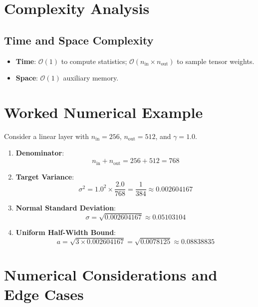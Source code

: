 \documentclass[11pt,a4paper]{article}
\theoremstyle{definition}
\begin{document}
\section{Complexity Analysis}

\subsection{Time and Space Complexity}
\begin{itemize}
    \item \textbf{Time}: $\mathcal{O}(1)$ to compute statistics; $\mathcal{O}(n_{\text{in}} \times n_{\text{out}})$ to sample tensor weights.
    \item \textbf{Space}: $\mathcal{O}(1)$ auxiliary memory.
\end{itemize}

\section{Worked Numerical Example}

Consider a linear layer with $n_{\text{in}} = 256$, $n_{\text{out}} = 512$, and $\gamma = 1.0$.

\begin{enumerate}
    \item \textbf{Denominator}:
    \begin{equation}
    n_{\text{in}} + n_{\text{out}} = 256 + 512 = 768
    \end{equation}
    \item \textbf{Target Variance}:
    \begin{equation}
    \sigma^2 = 1.0^2 \times \frac{2.0}{768} = \frac{1}{384} \approx 0.002604167
    \end{equation}
    \item \textbf{Normal Standard Deviation}:
    \begin{equation}
    \sigma = \sqrt{0.002604167} \approx 0.05103104
    \end{equation}
    \item \textbf{Uniform Half-Width Bound}:
    \begin{equation}
    a = \sqrt{3 \times 0.002604167} = \sqrt{0.0078125} \approx 0.08838835
    \end{equation}
\end{enumerate}

\section{Numerical Considerations and Edge Cases}
\end{document}
